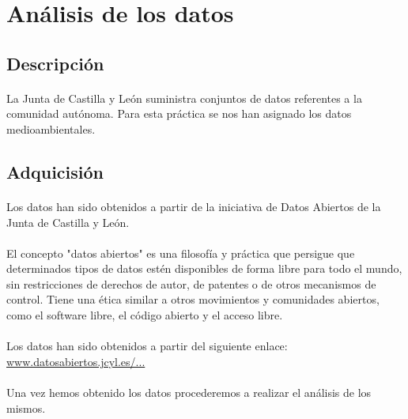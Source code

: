 \documentclass{article}
\begin{document}
	\section{Análisis de los datos}

		\subsection{Descripción}
			\paragraph{}
			La Junta de Castilla y León suministra conjuntos de datos referentes a la comunidad autónoma. Para esta práctica se nos han asignado los datos medioambientales.

		\subsection{Adquicisión}
			\paragraph{}
			Los datos han sido obtenidos a partir de la iniciativa de Datos Abiertos de la Junta de Castilla y León.

			\paragraph{}
			El concepto "datos abiertos" es una filosofía y práctica que persigue que determinados tipos de datos estén disponibles de forma libre para todo el mundo, sin restricciones de derechos de autor, de patentes o de otros mecanismos de control. Tiene una ética similar a otros movimientos y comunidades abiertos, como el software libre, el código abierto y el acceso libre.

			\paragraph{}
			Los datos han sido obtenidos a partir del siguiente enlace: \href{http://www.datosabiertos.jcyl.es/web/jcyl/set/es/mediciones/indicadoresambientales/1284227444931}{www.datosabiertos.jcyl.es/...}

			\paragraph{}
			Una vez hemos obtenido los datos procederemos a realizar el análisis de los mismos.
\end{document}
